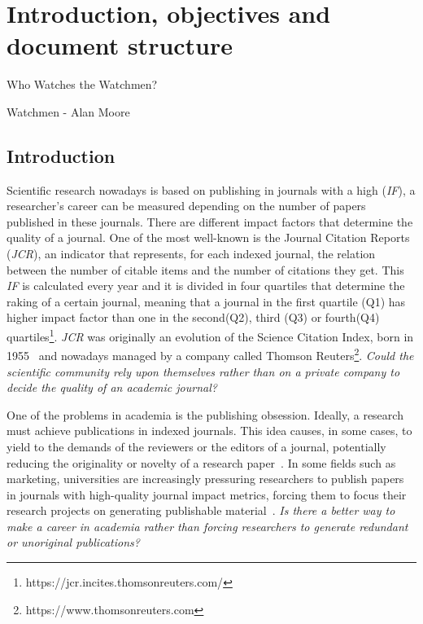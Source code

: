 
\chapter{Introduction, objectives and document structure}
\label{intro}
\begin{FraseCelebre}
  \begin{Frase}
    Who Watches the Watchmen?
  \end{Frase}
  \begin{Fuente}
    Watchmen - Alan Moore
  \end{Fuente}
\end{FraseCelebre}

\section{Introduction}

Scientific research nowadays is based on publishing in journals with a high
 (\emph{IF})\cite{doi:10.1001/jama.295.1.90}, a researcher's
career can be measured depending on the number of papers published in these
journals. There are different impact factors that determine the quality of a
journal. One of the most well-known is the Journal Citation Reports
(\emph{JCR}), an indicator that represents, for each indexed journal, the
relation between the number of citable items and the number of citations they
get. This \emph{IF} is calculated every year and it is divided in four quartiles
that determine the raking of a certain journal, meaning that a journal in the
first quartile (Q1) has higher impact factor than one in the second(Q2), third
(Q3) or fourth(Q4) quartiles\footnote{https://jcr.incites.thomsonreuters.com/}.
\emph{JCR} was originally an evolution of the Science Citation Index, born in
1955~\cite{garfield2007evolution} and nowadays managed by a company called
Thomson Reuters\footnote{https://www.thomsonreuters.com}. \emph{ Could the
  scientific community rely upon themselves rather than on a private company to
  decide the quality of an academic journal?}

One of the problems in academia is the publishing obsession. Ideally, a research
must achieve publications in indexed journals. This idea causes, in some cases,
to yield to the demands of the reviewers or the editors of a journal,
potentially reducing the originality or novelty of a research
paper~\cite{Frey2003}. In some fields such as marketing, universities are
increasingly pressuring researchers to publish papers in journals with
high-quality journal impact metrics, forcing them to focus their research
projects on generating publishable material~\cite{ortinau2011writing}. \emph{ Is
  there a better way to make a career in academia rather than forcing
  researchers to generate redundant or unoriginal publications?}

